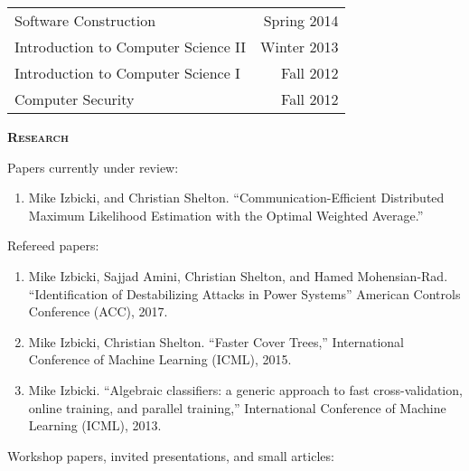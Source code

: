 \documentclass[12pt]{article}
\begin{document}
\noindent
\begin{tabularx}{\textwidth}{Xr}
Software Construction & Spring 2014 \\
Introduction to Computer Science II & Winter 2013 \\
Introduction to Computer Science I  & Fall 2012 \\
Computer Security & Fall 2012 \\
\end{tabularx}

\newpage
\noindent
{{\scshape \bfseries {Research}}}
\vspace{0.05in}

\noindent
Papers currently under review:
\begin{enumerate}
\item
Mike Izbicki, and Christian Shelton.
``Communication-Efficient Distributed Maximum Likelihood Estimation with the Optimal Weighted Average.''

\end{enumerate}

\noindent
Refereed papers:

\begin{enumerate}
\item
Mike Izbicki, Sajjad Amini, Christian Shelton, and Hamed Mohensian-Rad.
``Identification of Destabilizing Attacks in Power Systems''
American Controls Conference (ACC),
2017.

\item
Mike Izbicki, Christian Shelton.
``Faster Cover Trees,''
International Conference of Machine Learning (ICML),
2015.

\item
Mike Izbicki.
``Algebraic classifiers: a generic approach to fast cross-validation, online training, and parallel training,''
International Conference of Machine Learning (ICML),
2013.
\end{enumerate}

\noindent
Workshop papers, invited presentations, and small articles:
\end{document}
